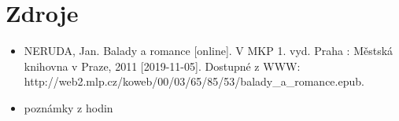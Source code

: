 \documentclass[10pt,a4paper]{article}
\begin{document}
\section*{Zdroje}
\begin{itemize}
\item NERUDA, Jan. Balady a romance [online]. V MKP 1. vyd. Praha : Městská knihovna v Praze, 2011 [2019-11-05]. Dostupné z WWW:\\
http://web2.mlp.cz/koweb/00/03/65/85/53/balady\_a\_romance.epub.
\item poznámky z hodin
\end{itemize}
\end{document}
